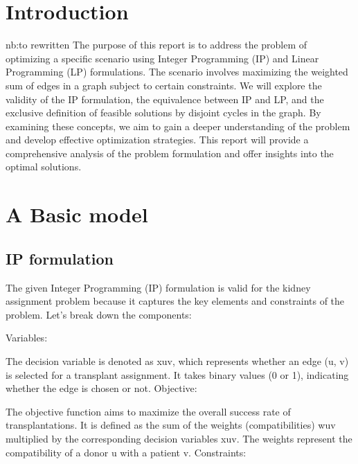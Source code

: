 \documentclass{ULBreport}
\begin{document}

\chapter{Introduction}
nb:to rewritten 
The purpose of this report is to address the problem of optimizing a specific scenario using Integer Programming (IP) and Linear Programming (LP) formulations. The scenario involves maximizing the weighted sum of edges in a graph subject to certain constraints. We will explore the validity of the IP formulation, the equivalence between IP and LP, and the exclusive definition of feasible solutions by disjoint cycles in the graph. By examining these concepts, we aim to gain a deeper understanding of the problem and develop effective optimization strategies. This report will provide a comprehensive analysis of the problem formulation and offer insights into the optimal solutions.
\chapter{A Basic model}
\section{IP formulation}
The given Integer Programming (IP) formulation is valid for the kidney assignment problem because it captures the key elements and constraints of the problem. Let's break down the components:

Variables:

The decision variable is denoted as xuv, which represents whether an edge (u, v) is selected for a transplant assignment. It takes binary values (0 or 1), indicating whether the edge is chosen or not.
Objective:

The objective function aims to maximize the overall success rate of transplantations. It is defined as the sum of the weights (compatibilities) wuv multiplied by the corresponding decision variables xuv. The weights represent the compatibility of a donor u with a patient v.
Constraints:
\end{document}
